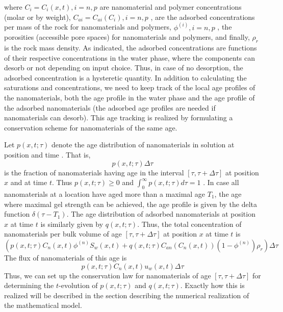\documentclass[energies,article,submit,moreauthors,pdftex]{Definitions/mdpi}
\begin{document}
where $C_i=C_i(x,t), i=n,p$ are nanomaterial and polymer concentrations (molar or by weight), $C_{ai}=C_{ai}(C_i), i=n,p$ , are the adsorbed concentrations per mass of the rock for nanomaterials and polymers, $\phi^{(i)}, i=n,p$ , the porosities (accessible pore spaces) for nanomaterials and polymers, and finally, $\rho_r$ is the rock mass density. As indicated, the adsorbed concentrations are functions of their respective concentrations in the water phase, where the components can desorb or not depending on input choice. Thus, in case of no desorption, the adsorbed concentration is a hysteretic quantity.   
In addition to calculating the saturations and concentrations, we need to keep track of the local age profiles of the nanomaterials, both the age profile in the water phase and the age profile of the adsorbed nanomaterials (the adsorbed age profiles are needed if nanomaterials can desorb). This age tracking is realized by formulating a conservation scheme for nanomaterials of the same age.   

Let  $p(x,t;\tau)$ denote the age distribution of nanomaterials in solution at position  and time  . That is, 
\begin{equation*}
    p(x,t;\tau)\Delta\tau
\end{equation*}
is the fraction of nanomaterials having age in the interval $[\tau, \tau+\Delta\tau]$  at position $x$ and at time $t$. Thus $p(x,t;\tau)\geq 0$ and $\int_{0}^{\infty}{p(x,t;\tau)d\tau}=1$ . In case all nanomaterials at a location have aged more than a maximal age $T_1$, the age where maximal gel strength can be achieved, the age profile is given by the delta function $\delta(\tau-T_1)$. The age distribution of adsorbed nanomaterials at position $x$ at time $t$ is similarly given by $q(x,t;\tau)$. Thus, the total concentration of nanomaterials per bulk volume of age  $[\tau, \tau+\Delta\tau]$ at position $x$ at time $t$ is
\begin{equation}
    \left(p(x,t;\tau)C_n(x,t)\phi^{(n)}S_w(x,t)+q(x,t;\tau)C_{an}\left(C_n(x,t)\right)(1-\phi^{(n)})\rho_r\right)\Delta\tau
\end{equation}
The flux of nanomaterials of this age is
\begin{equation}
    p(x,t;\tau)C_n(x,t)u_w(x,t)\Delta\tau
\end{equation}
Thus, we can set up the conservation law for nanomaterials of age $[\tau, \tau+\Delta\tau]$  for determining the   $t$-evolution of $p(x,t;\tau)$ and $q(x,t;\tau)$. Exactly how this is realized will be described in the section describing the numerical realization of the mathematical model.
\end{document}
